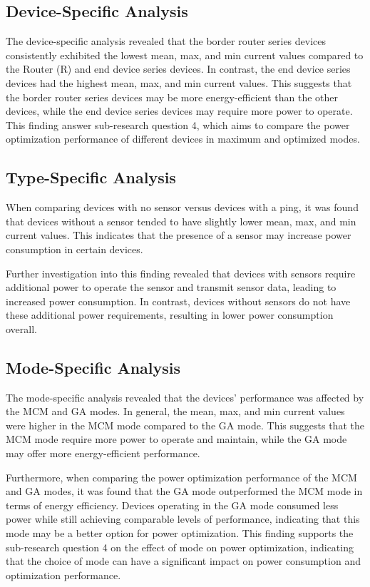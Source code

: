 \subsection{Device-Specific Analysis}

The device-specific analysis revealed that the border router series devices consistently exhibited the lowest mean, max, and min current values compared to the Router (R) and end device series devices. In contrast, the end device series devices had the highest mean, max, and min current values. This suggests that the border router series devices may be more energy-efficient than the other devices, while the end device series devices may require more power to operate. This finding answer sub-research question 4, which aims to compare the power optimization performance of different devices in maximum and optimized modes.


\subsection{Type-Specific Analysis}

When comparing devices with no sensor versus devices with a ping, it was found that devices without a sensor tended to have slightly lower mean, max, and min current values. This indicates that the presence of a sensor may increase power consumption in certain devices.

Further investigation into this finding revealed that devices with sensors require additional power to operate the sensor and transmit sensor data, leading to increased power consumption. In contrast, devices without sensors do not have these additional power requirements, resulting in lower power consumption overall.


\subsection{Mode-Specific Analysis}

The mode-specific analysis revealed that the devices' performance was affected by the \gls{MCM} and \gls{GA} modes. In general, the mean, max, and min current values were higher in the \gls{MCM} mode compared to the \gls{GA} mode. This suggests that the \gls{MCM} mode require more power to operate and maintain, while the \gls{GA} mode may offer more energy-efficient performance.

Furthermore, when comparing the power optimization performance of the \gls{MCM} and \gls{GA} modes, it was found that the \gls{GA} mode outperformed the \gls{MCM} mode in terms of energy efficiency. Devices operating in the \gls{GA} mode consumed less power while still achieving comparable levels of performance, indicating that this mode may be a better option for power optimization. This finding supports the sub-research question 4 on the effect of mode on power optimization, indicating that the choice of mode can have a significant impact on power consumption and optimization performance.


